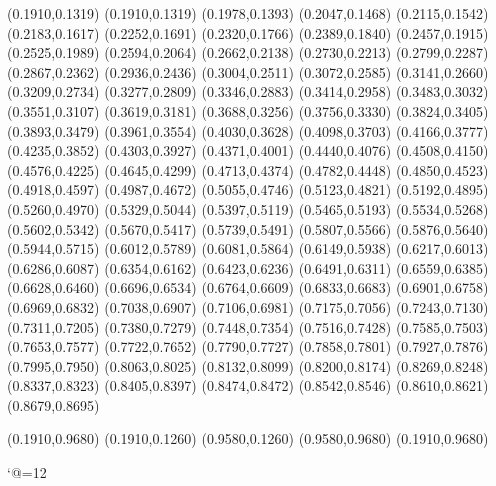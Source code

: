 \PST@Dotted(0.1910,0.1319)
(0.1910,0.1319)
(0.1978,0.1393)
(0.2047,0.1468)
(0.2115,0.1542)
(0.2183,0.1617)
(0.2252,0.1691)
(0.2320,0.1766)
(0.2389,0.1840)
(0.2457,0.1915)
(0.2525,0.1989)
(0.2594,0.2064)
(0.2662,0.2138)
(0.2730,0.2213)
(0.2799,0.2287)
(0.2867,0.2362)
(0.2936,0.2436)
(0.3004,0.2511)
(0.3072,0.2585)
(0.3141,0.2660)
(0.3209,0.2734)
(0.3277,0.2809)
(0.3346,0.2883)
(0.3414,0.2958)
(0.3483,0.3032)
(0.3551,0.3107)
(0.3619,0.3181)
(0.3688,0.3256)
(0.3756,0.3330)
(0.3824,0.3405)
(0.3893,0.3479)
(0.3961,0.3554)
(0.4030,0.3628)
(0.4098,0.3703)
(0.4166,0.3777)
(0.4235,0.3852)
(0.4303,0.3927)
(0.4371,0.4001)
(0.4440,0.4076)
(0.4508,0.4150)
(0.4576,0.4225)
(0.4645,0.4299)
(0.4713,0.4374)
(0.4782,0.4448)
(0.4850,0.4523)
(0.4918,0.4597)
(0.4987,0.4672)
(0.5055,0.4746)
(0.5123,0.4821)
(0.5192,0.4895)
(0.5260,0.4970)
(0.5329,0.5044)
(0.5397,0.5119)
(0.5465,0.5193)
(0.5534,0.5268)
(0.5602,0.5342)
(0.5670,0.5417)
(0.5739,0.5491)
(0.5807,0.5566)
(0.5876,0.5640)
(0.5944,0.5715)
(0.6012,0.5789)
(0.6081,0.5864)
(0.6149,0.5938)
(0.6217,0.6013)
(0.6286,0.6087)
(0.6354,0.6162)
(0.6423,0.6236)
(0.6491,0.6311)
(0.6559,0.6385)
(0.6628,0.6460)
(0.6696,0.6534)
(0.6764,0.6609)
(0.6833,0.6683)
(0.6901,0.6758)
(0.6969,0.6832)
(0.7038,0.6907)
(0.7106,0.6981)
(0.7175,0.7056)
(0.7243,0.7130)
(0.7311,0.7205)
(0.7380,0.7279)
(0.7448,0.7354)
(0.7516,0.7428)
(0.7585,0.7503)
(0.7653,0.7577)
(0.7722,0.7652)
(0.7790,0.7727)
(0.7858,0.7801)
(0.7927,0.7876)
(0.7995,0.7950)
(0.8063,0.8025)
(0.8132,0.8099)
(0.8200,0.8174)
(0.8269,0.8248)
(0.8337,0.8323)
(0.8405,0.8397)
(0.8474,0.8472)
(0.8542,0.8546)
(0.8610,0.8621)
(0.8679,0.8695)

\PST@Border(0.1910,0.9680)
(0.1910,0.1260)
(0.9580,0.1260)
(0.9580,0.9680)
(0.1910,0.9680)

\catcode`@=12
\fi
\endpspicture
